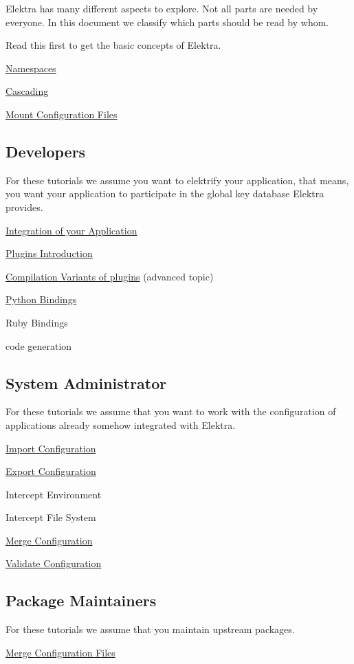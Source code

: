 Elektra has many different aspects to explore. Not all parts are needed by everyone. In this document we classify which parts should be read by whom.

Read this first to get the basic concepts of Elektra.


\begin{DoxyItemize}
\item \hyperlink{doc_tutorials_namespaces_md}{Namespaces}
\item \hyperlink{doc_tutorials_cascading_md}{Cascading}
\item \hyperlink{doc_tutorials_mount_md}{Mount Configuration Files}
\end{DoxyItemize}

\subsection*{Developers}

For these tutorials we assume you want to elektrify your application, that means, you want your application to participate in the global key database Elektra provides.


\begin{DoxyItemize}
\item \hyperlink{doc_tutorials_application-integration_md}{Integration of your Application}
\item \hyperlink{doc_tutorials_plugins_md}{Plugins Introduction}
\item \hyperlink{doc_tutorials_compilation-variants_md}{Compilation Variants of plugins} (advanced topic)
\item \hyperlink{doc_tutorials_python-kdb_md}{Python Bindings}
\item Ruby Bindings
\item code generation
\end{DoxyItemize}

\subsection*{System Administrator}

For these tutorials we assume that you want to work with the configuration of applications already somehow integrated with Elektra.


\begin{DoxyItemize}
\item \hyperlink{doc_tutorials_import_md}{Import Configuration}
\item \hyperlink{doc_tutorials_export_md}{Export Configuration}
\item Intercept Environment
\item Intercept File System
\item \hyperlink{doc_tutorials_merge_md}{Merge Configuration}
\item \hyperlink{doc_tutorials_validation_md}{Validate Configuration}
\end{DoxyItemize}

\subsection*{Package Maintainers}

For these tutorials we assume that you maintain upstream packages.


\begin{DoxyItemize}
\item \hyperlink{doc_tutorials_elektra-merge-integration_md}{Merge Configuration Files} 
\end{DoxyItemize}
